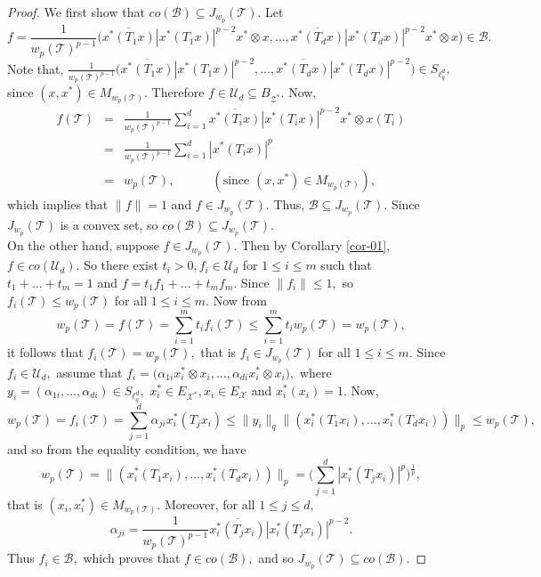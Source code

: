 \documentclass{amsart}
\theoremstyle{definition}
\theoremstyle{remark}
\numberwithin{equation}{section}
\begin{document}
\begin{proof}
We first show that $co(\mathcal{B})\subseteq J_{w_p}(\mathcal{T}).$
Let $$f=\frac{1}{w_p(\mathcal{T})^{p-1}}\bigg(\overline{x^*(T_1x)}|x^*(T_1x)|^{p-2}x^*\otimes x,\ldots,\overline{x^*(T_dx)}|x^*(T_dx)|^{p-2}x^*\otimes x\bigg)\in \mathcal{B}.$$ Note that, $\frac{1}{w_p(\mathcal{T})^{p-1}}\bigg(\overline{x^*(T_1x)}|x^*(T_1x)|^{p-2},\ldots,\overline{x^*(T_dx)}|x^*(T_dx)|^{p-2}\bigg)\in S_{\ell_q^d},$ since $ (x,x^*)\in M_{w_p(\mathcal{T})}.$ Therefore $f\in \mathcal{U}_d\subseteq B_{\mathcal{Z}^*}.$ Now,
\begin{eqnarray*}
	f(\mathcal{T})&=&\frac{1}{w_p(\mathcal{T})^{p-1}}\sum_{i=1}^d\overline{x^*(T_ix)}|x^*(T_ix)|^{p-2}x^*\otimes x(T_i)\\
	&=&\frac{1}{w_p(\mathcal{T})^{p-1}}\sum_{i=1}^d|x^*(T_ix)|^{p}\\
	&=& w_p(\mathcal{T}),\quad \quad \quad (\text{since } (x,x^*)\in M_{w_p(\mathcal{T})}),
	\end{eqnarray*}
which implies that $\|f\|=1$ and $f\in J_{w_p}(\mathcal{T}).$ Thus, $\mathcal{B}\subseteq J_{w_p}(\mathcal{T}).$ Since $J_{w_p}(\mathcal{T})$ is a convex set, so $co(\mathcal{B})\subseteq J_{w_p}(\mathcal{T}).$\\
On the other hand, suppose $f\in J_{w_p}(\mathcal{T}).$ Then by Corollary \ref{cor-01}, $f\in co(\mathcal{U}_d).$ So there exist $t_i>0,f_i\in \mathcal{U}_d$ for $1\leq i\leq m$ such that $t_1+\ldots+t_m=1$ and $f=t_1f_1+\ldots+t_mf_m.$ Since $\|f_i\|\leq 1,$ so $f_i(\mathcal{T})\leq w_p(\mathcal{T})$ for all $1\leq i\leq m.$ Now from
\[w_p(\mathcal{T})=f(\mathcal{T})=\sum_{i=1}^mt_if_i(\mathcal{T})\leq \sum_{i=1}^mt_iw_p(\mathcal{T})=w_p(\mathcal{T}),\]
it follows that $f_i(\mathcal{T})=w_p(\mathcal{T}),$ that is $f_i\in J_{w_p}(\mathcal{T})$ for all $1\leq i\leq m.$  Since $f_i\in \mathcal{U}_d,$ assume that $f_i=\bigg(\alpha_{1i}x_i^*\otimes x_i,\ldots,\alpha_{di}x_i^*\otimes x_i\bigg),$ where $y_i=(\alpha_{1i},\ldots,\alpha_{di})\in S_{\ell_q^d},$  $x_i^*\in E_{\mathcal{X}^*},  x_i\in E_{\mathcal{X}}$ and $x_i^*(x_i)=1.$ Now,
\[w_p(\mathcal{T})=f_i(\mathcal{T})=\sum_{j=1}^d\alpha_{ji}x_i^*(T_jx_i)\leq \|y_i\|_q\|(x_i^*(T_1x_i),\ldots,x_i^*(T_dx_i))\|_p\leq w_p(\mathcal{T}),\] and so from the equality condition, we have
\[w_p(\mathcal{T})=\|(x_i^*(T_1x_i),\ldots,x_i^*(T_dx_i))\|_p=\Big(\sum_{j=1}^d|x_i^*(T_jx_i)|^p\Big)^{\frac{1}{p}},\]
that is $(x_i,x_i^*)\in M_{w_p(\mathcal{T})}.$
Moreover,  for all $1\leq j\leq d,$
\[\alpha_{ji}=\frac{1}{w_p(\mathcal{T})^{p-1}}\overline{x_i^*(T_jx_i)}|x_i^*(T_jx_i)|^{p-2}.\]
Thus $f_i\in \mathcal{B},$ which proves that $f\in co(\mathcal{B}),$ and so $J_{w_p}(\mathcal{T})\subseteq co(\mathcal{B}).$
\end{proof}
\end{document}
